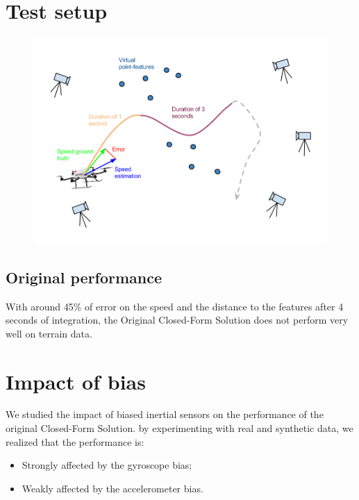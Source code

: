 \documentclass[final]{beamer}
\begin{document}
\begin{frame}[t]
\begin{multicols}{3}
\section{Test setup}

\begin{figure}
\centering
\includegraphics[width=\columnwidth]{images/setupTestDroneError.png}
\end{figure}

\subsection{Original performance}

\begin{figure}[h!]
  \centering
  \resizebox{0.7\columnwidth}{!}{}
\end{figure}

With around 45\% of error on the speed and the distance to the features after 4 seconds of integration, the Original Closed-Form Solution does not perform very well on terrain data.

\section{Impact of bias}
We studied the impact of biased inertial sensors on the performance of the original Closed-Form Solution.
by experimenting with real and synthetic data, we realized that the performance is:
\begin{itemize}
 \item Strongly affected by the gyroscope bias;
 \item Weakly affected by the accelerometer bias.
\end{itemize}


\end{multicols}
\end{frame}
\end{document}
